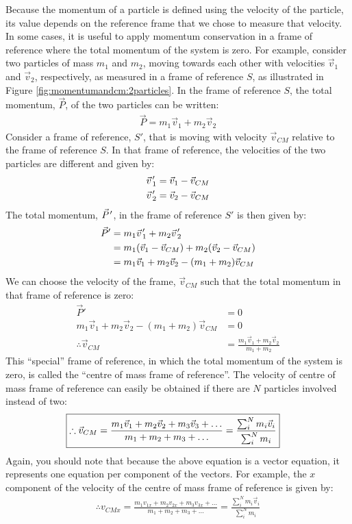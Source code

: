 Because the momentum of a particle is defined using the velocity of the particle, its value depends on the reference frame that we chose to measure that velocity. In some cases, it is useful to apply momentum conservation in a frame of reference where the total momentum of the system is zero. For example, consider two particles of mass $m_1$ and $m_2$, moving towards each other with velocities $\vec v_1$ and $\vec v_2$, respectively, as measured in a frame of reference $S$, as illustrated in Figure \ref{fig:momentumandcm:2particles}.
In the frame of reference $S$, the total momentum, $\vec P$, of the two particles can be written:
\begin{align*}
\vec P = m_1\vec v_1 + m_2\vec v_2
\end{align*}
Consider a frame of reference, $S'$, that is moving with velocity $\vec v_{CM}$ relative to the frame of reference $S$. In that frame of reference, the velocities of the two particles are different and given by:
\begin{align*}
\pvec v'_1&=\vec v_1- \vec v_{CM}\\
\pvec v'_2&=\vec v_2- \vec v_{CM}
\end{align*}
The total momentum, $\pvec P'$, in the frame of reference $S'$ is then given by:
\begin{align*}
\vec P' &= m_1\pvec v'_1 + m_2 \pvec v'_2\\
&=m_1(\vec v_1- \vec v_{CM})+m_2(\vec v_2- \vec v_{CM})\\
&= m_1\vec v_1 + m_2\vec v_2 - (m_1+m_2) \vec v_{CM}
\end{align*}
We can choose the velocity of the frame, $\vec v_{CM}$ such that the total momentum in that frame of reference is zero:
\begin{align*}
\vec P' &= 0\\
m_1\vec v_1 + m_2\vec v_2 - (m_1+m_2) \vec v_{CM} &=0\\
\therefore \vec v_{CM} &= \frac{m_1\vec v_1 + m_2\vec v_2 }{m_1+m_2}
\end{align*}
This ``special'' frame of reference, in which the total momentum of the system is zero, is called the ``centre of mass frame of reference''. The velocity of centre of mass frame of reference can easily be obtained if there are $N$ particles involved instead of two:
\begin{align}
\Aboxed{\therefore \vec v_{CM} = \frac{m_1\vec v_1 + m_2\vec v_2 + m_3 \vec v_3 + \dots }{m_1+m_2+m_3+\dots}=\frac{\sum_i^N m_i\vec v_i}{\sum_i^N m_i}}
\end{align}
Again, you should note that because the above equation is a vector equation, it represents one equation per component of the vectors. For example, the $x$ component of the velocity of the centre of mass frame of reference is given by:
\begin{align*}
\therefore  v_{CMx} = \frac{m_1 v_{1x} + m_2v_{2x} + m_3 v_{3x} + \dots }{m_1+m_2+m_3+\dots}=\frac{\sum_i^N m_i\vec v_i}{\sum_i^N m_i}
\end{align*}


